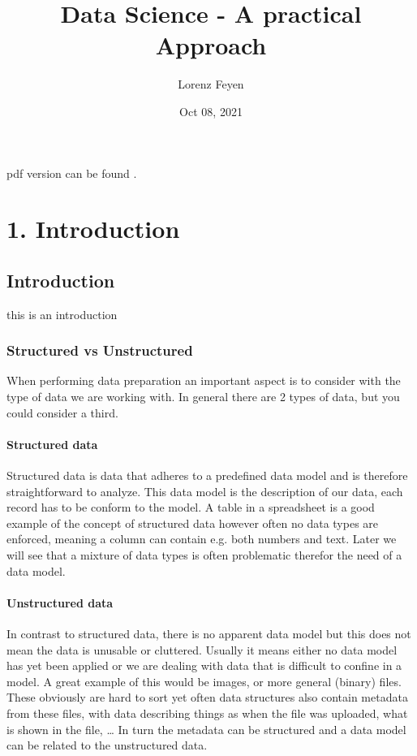 \documentclass[letterpaper,10pt,english]{jupyterBook}
\title{Data Science - A practical Approach}
\date{Oct 08, 2021}
\author{Lorenz Feyen}
\begin{document}
\pagestyle{empty}
\sphinxmaketitle
\pagestyle{plain}
\sphinxtableofcontents
\pagestyle{normal}
\label{\detokenize{foreword::doc}}


\sphinxAtStartPar
pdf version can be found .


\part{1. Introduction}


\chapter{Introduction}
\label{\detokenize{c1_introduction/introduction:introduction}}\label{\detokenize{c1_introduction/introduction::doc}}
\sphinxAtStartPar
this is an introduction


\section{Structured vs Unstructured}
\label{\detokenize{c1_introduction/introduction:structured-vs-unstructured}}
\sphinxAtStartPar
When performing data preparation an important aspect is to consider with the type of data we are working with.
In general there are 2 types of data, but you could consider a third.


\subsection{Structured data}
\label{\detokenize{c1_introduction/introduction:structured-data}}
\sphinxAtStartPar
Structured data is data that adheres to a pre\sphinxhyphen{}defined data model and is therefore straightforward to analyze.
This data model is the description of our data, each record has to be conform to the model.
A table in a spreadsheet is a good example of the concept of structured data however often no data types are enforced, meaning a column can contain e.g. both numbers and text.
Later we will see that a mixture of data types is often problematic therefor the need of a data model.


\subsection{Unstructured data}
\label{\detokenize{c1_introduction/introduction:unstructured-data}}
\sphinxAtStartPar
In contrast to structured data, there is no apparent data model but this does not mean the data is unusable or cluttered.
Usually it means either no data model has yet been applied or we are dealing with data that is difficult to confine in a model.
A great example of this would be images, or more general (binary) files.
These obviously are hard to sort yet often data structures also contain metadata from these files, with data describing things as when the file was uploaded, what is shown in the file, …
In turn the metadata can be structured and a data model can be related to the unstructured data.
\end{document}
